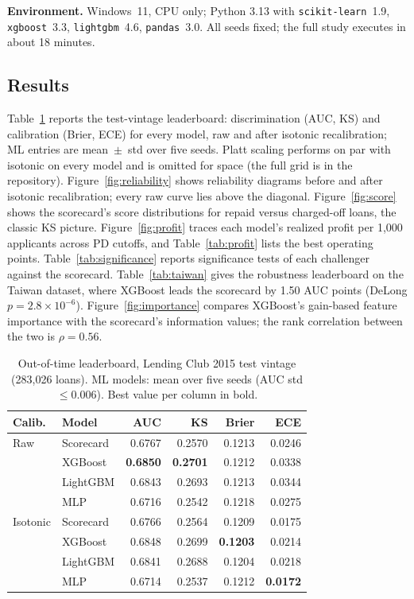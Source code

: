 \documentclass[a4paper,twocolumn,10pt]{article}
\begin{document}
\textbf{Environment.} Windows~11, CPU only; Python 3.13 with \texttt{scikit-learn}~1.9, \texttt{xgboost}~3.3, \texttt{lightgbm}~4.6, \texttt{pandas}~3.0. All seeds fixed; the full study executes in about 18 minutes.

\subsection{Results}

Table~\ref{tab:leaderboard} reports the test-vintage leaderboard: discrimination (AUC, KS) and calibration (Brier, ECE) for every model, raw and after isotonic recalibration; ML entries are mean~$\pm$~std over five seeds. Platt scaling performs on par with isotonic on every model and is omitted for space (the full grid is in the repository). Figure~\ref{fig:reliability} shows reliability diagrams before and after isotonic recalibration; every raw curve lies above the diagonal. Figure~\ref{fig:score} shows the scorecard's score distributions for repaid versus charged-off loans, the classic KS picture. Figure~\ref{fig:profit} traces each model's realized profit per 1{,}000 applicants across PD cutoffs, and Table~\ref{tab:profit} lists the best operating points. Table~\ref{tab:significance} reports significance tests of each challenger against the scorecard. Table~\ref{tab:taiwan} gives the robustness leaderboard on the Taiwan dataset, where XGBoost leads the scorecard by 1.50 AUC points (DeLong $p = 2.8\times10^{-6}$). Figure~\ref{fig:importance} compares XGBoost's gain-based feature importance with the scorecard's information values; the rank correlation between the two is $\rho = 0.56$.

\begin{table}[t]
\centering
\caption{Out-of-time leaderboard, Lending Club 2015 test vintage (283{,}026 loans). ML models: mean over five seeds (AUC std $\le 0.006$). Best value per column in bold.}
\label{tab:leaderboard}
\small
\begin{tabular}{llrrrr}
\toprule
Calib. & Model & AUC & KS & Brier & ECE \\
\midrule
Raw & Scorecard & 0.6767 & 0.2570 & 0.1213 & 0.0246 \\
    & XGBoost   & \textbf{0.6850} & \textbf{0.2701} & 0.1212 & 0.0338 \\
    & LightGBM  & 0.6843 & 0.2693 & 0.1213 & 0.0344 \\
    & MLP       & 0.6716 & 0.2542 & 0.1218 & 0.0275 \\
\midrule
Isotonic & Scorecard & 0.6766 & 0.2564 & 0.1209 & 0.0175 \\
         & XGBoost   & 0.6848 & 0.2699 & \textbf{0.1203} & 0.0214 \\
         & LightGBM  & 0.6841 & 0.2688 & 0.1204 & 0.0218 \\
         & MLP       & 0.6714 & 0.2537 & 0.1212 & \textbf{0.0172} \\
\bottomrule
\end{tabular}
\end{table}
\end{document}
